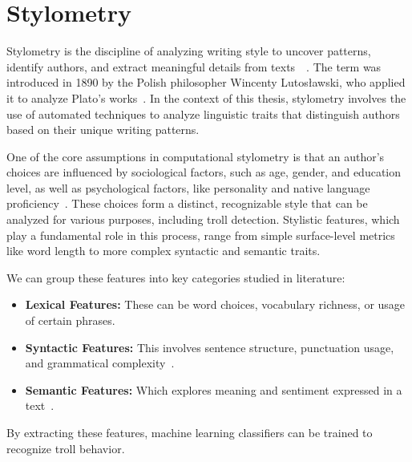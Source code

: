 \documentclass[twoside]{ctuthesis}
\theoremstyle{plain}
\theoremstyle{definition}
\theoremstyle{note}
\begin{document}
\section{Stylometry}
Stylometry is the discipline of analyzing writing style to uncover patterns, identify authors, and extract meaningful details from texts~\cite{Mosteller1964Federalist}~\cite{Pascucci2020Misogyny}. The term was introduced in 1890 by the Polish philosopher Wincenty Lutosławski, who applied it to analyze Plato's works~\cite{Lutoslawski1898}. In the context of this thesis,  stylometry involves the use of automated techniques to analyze linguistic traits that distinguish authors based on their unique writing patterns.\par
One of the core assumptions in computational stylometry is that an author’s choices are influenced by sociological factors, such as age, gender, and education level, as well as psychological factors, like personality and native language proficiency~\cite{Daelemans2013Explanation}. These choices form a distinct, recognizable style that can be analyzed for various purposes, including troll detection. Stylistic features, which play a fundamental role in this process, range from simple surface-level metrics like word length to more complex syntactic and semantic traits.\par
We can group these features into key categories studied in literature:
\begin{itemize}
    \item \textbf{Lexical Features:} These can be word choices, vocabulary richness, or usage of certain phrases.
    \item \textbf{Syntactic Features:} This involves sentence structure, punctuation usage, and grammatical complexity~\cite{Sari2018Features}.
    \item \textbf{Semantic Features:} Which explores meaning and sentiment expressed in a text~\cite{PerezRosas2018Stylometry}.
\end{itemize}
By extracting these features, machine learning classifiers can be trained to recognize troll behavior.
\end{document}
